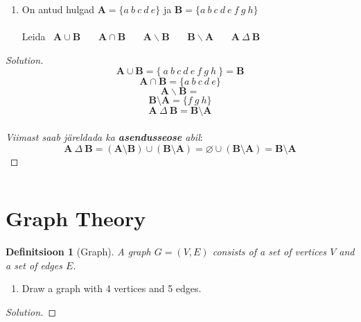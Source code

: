 \documentclass[12pt]{article}
\newtheorem{definition}[theorem]{Definitsioon}
\newenvironment{problem}[1][]{
    \begin{enumerate}[label=\textbf{Harjutus \arabic*.}, ref=#1, leftmargin=*, topsep=0.5em]
}{\end{enumerate}}
\newenvironment{solution}{
    \begin{proof}[Solution]
}{\end{proof}}
\begin{document}
\begin{problem} 
	\item On antud hulgad $\mathbf{A} = \{ a \ b \ c \ d \ e \}$ ja $\mathbf{B} = \{ a \ b \ c \ d \ e \ f \ g \ h \}$ \\ \\ 
		Leida \ $\mathbf{A \cup B}$ \ \ \ $\mathbf{A \cap B}$ \ \ \ $\mathbf{A \backslash B}$ \ \ \ $\mathbf{B \backslash A}$ \ \ \ $\mathbf{A} \ \Delta \ \mathbf{B}$
\end{problem}
\begin{solution}
	\[
		\mathbf{A} \cup \mathbf{B} = {\{ \ a \ b \ c \ d \ e \ f \ g \ h \ \}} = \mathbf{B}
\] 
\[ 
	\mathbf{A} \cap \mathbf{B} = {\{ a \ b \ c \ d \ e \}}
\]
\[ 
	\mathbf{A} \backslash \mathbf{B} = {}
\]
\[ 
	\mathbf{B} \setminus \mathbf{A} = \{f \ g \ h \}
\]
\[ 
	\mathbf{A} \ \Delta \ \mathbf{B} = \mathbf{B} \setminus \mathbf{A}
\]
\\
\textit{Viimast saab järeldada ka \textbf{asendusseose} abil}:  
\[ 
	\mathbf{A} \ \Delta \ \mathbf{B} = (\mathbf{A} \setminus \mathbf{B}) \cup (\mathbf{B} \setminus \mathbf{A}) = \varnothing \cup (\mathbf{B} \setminus \mathbf{A}) = \mathbf{B} \setminus \mathbf{A}
\] 

\end{solution}

\[
\]
\newpage
\section{Graph Theory}
\begin{definition}[Graph]
A graph \( G = (V, E) \) consists of a set of vertices \( V \) and a set of edges \( E \).
\end{definition}

\begin{problem}
\item Draw a graph with 4 vertices and 5 edges.
\end{problem}

\begin{solution}
\end{solution}

\end{document}
